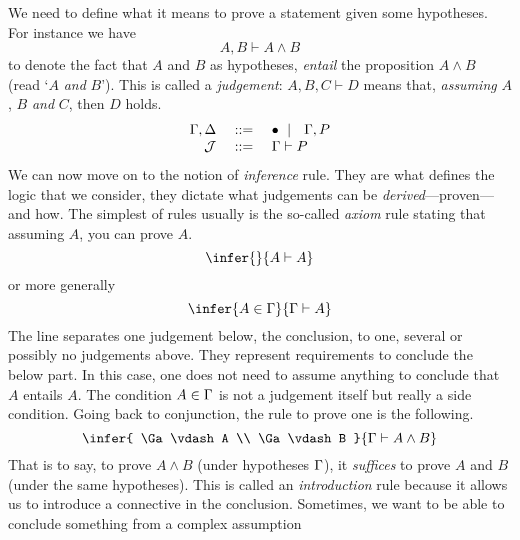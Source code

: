 We need to define what it means to prove a statement given some hypotheses.
For instance we have
\[
  A, B \vdash A \wedge B
\]
to denote the fact that \(A\) and \(B\) as hypotheses, \emph{entail} the
proposition \(A \wedge B\) (read `\(A\) \emph{and} \(B\)').
This is called a \emph{judgement}: \(A, B, C \vdash D\) means that,
\emph{assuming} \(A\), \(B\) \emph{and} \(C\), then \(D\) holds.
\[
  \begin{array}{rcl}
    \Gamma, \Delta &\ \mathrel{{:}{:}{=}}\ & \bullet \ \mid\ \  \Gamma, P \\
    \mathcal{J} &\ \mathrel{{:}{:}{=}}\ & \Gamma \vdash P
  \end{array}
\]
We can now move on to the notion of \emph{inference} rule. They are what defines
the logic that we consider, they dictate what judgements can be
\emph{derived}---\ie proven---and how.
The simplest of rules usually is the so-called \emph{axiom} rule stating that
assuming \(A\), you can prove \(A\).
\[
  \infer
    { }
    {A \vdash A}
\]
or more generally
\[
  \infer
    {A \in \Ga}
    {\Ga \vdash A}
\]
The line separates one judgement below, the conclusion, to one, several or
possibly no judgements above. They represent requirements to conclude the below
part. In this case, one does not need to assume anything to conclude that \(A\)
entails \(A\). The condition \(A \in \Gamma\) is not a judgement itself but really
a side condition.
Going back to conjunction, the rule to prove one is the following.
\[
  \infer
    {
      \Ga \vdash A \\
      \Ga \vdash B
    }
    {\Ga \vdash A \wedge B}
\]
That is to say, to prove \(A \wedge B\) (under hypotheses \(\Gamma\)), it
\emph{suffices} to prove \(A\) and \(B\) (under the same hypotheses).
This is called an \emph{introduction} rule because it allows us to introduce a
connective in the conclusion.
Sometimes, we want to be able to conclude something from a complex assumption
